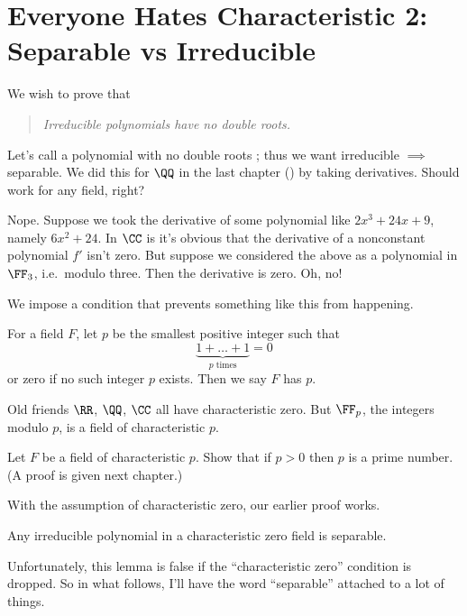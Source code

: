 \section{Everyone Hates Characteristic 2: Separable vs Irreducible}
We wish to prove that
\begin{quote}
	\itshape Irreducible polynomials have no double roots.
\end{quote}
Let's call a polynomial with no double roots ;
thus we want irreducible $\implies$ separable.
We did this for $\QQ$ in the last chapter () by taking derivatives.
Should work for any field, right?

Nope.
Suppose we took the derivative of some polynomial like $2x^3 + 24x + 9$,
namely $6x^2 + 24$.
In $\CC$ is it's obvious that the derivative of a nonconstant polynomial $f'$ isn't zero.
But suppose we considered the above as a polynomial in $\FF_3$, i.e.\ modulo three.
Then the derivative is zero.
Oh, no!

We impose a condition that prevents something like this from happening.
\begin{definition}
	For a field $F$, let $p$ be the smallest positive integer such that
	\[ \underbrace{1+\dots+1}_{\text{$p$ times}} = 0 \]
	or zero if no such integer $p$ exists.
	Then we say $F$ has  $p$.
\end{definition}
\begin{example}
	Old friends $\RR$, $\QQ$, $\CC$ all have characteristic zero.
	But $\FF_p$, the integers modulo $p$, is a field of characteristic $p$.
\end{example}
\begin{exercise}
	Let $F$ be a field of characteristic $p$.
	Show that if $p > 0$ then $p$ is a prime number.
	(A proof is given next chapter.)
\end{exercise}
With the assumption of characteristic zero, our earlier proof works.
\begin{lemma}
	Any irreducible polynomial in a characteristic zero field is separable.
\end{lemma}
Unfortunately, this lemma is false if the ``characteristic zero'' condition is dropped.
So in what follows, I'll have the word ``separable'' attached to a lot of things.

